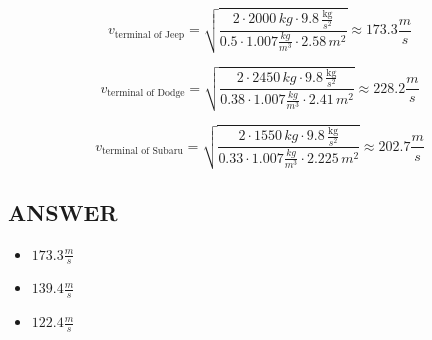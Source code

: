 $$ v_{\text{terminal of Jeep}} = \sqrt{\frac{2 \cdot 2000 \, kg \cdot 9.8 \, \frac{\text{kg}}{s^2}}{0.5 \cdot 1.007 \frac{kg}{m^3} \cdot 2.58 \, m^2}} \approx \boxed{173.3 \frac{m}{s}}$$

$$ v_{\text{terminal of Dodge}} = \sqrt{\frac{2 \cdot 2450 \, kg \cdot 9.8 \, \frac{\text{kg}}{s^2}}{0.38 \cdot 1.007 \frac{kg}{m^3} \cdot 2.41 \, m^2}}  \approx \boxed{228.2 \frac{m}{s}}$$ 

$$ v_{\text{terminal of Subaru}} = \sqrt{\frac{2 \cdot 1550 \, kg \cdot 9.8 \, \frac{\text{kg}}{s^2}}{0.33 \cdot 1.007 \frac{kg}{m^3} \cdot 2.225 \, m^2}} \approx \boxed{202.7 \frac{m}{s}}$$ 


\vfill \subsection*{ANSWER}
\begin{itemize}
    \item $173.3 \frac{m}{s}$
    \item $139.4 \frac{m}{s}$
    \item $122.4 \frac{m}{s}$
\end{itemize}

